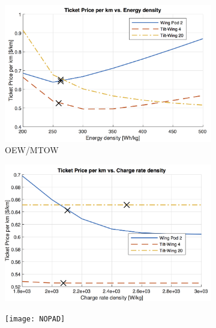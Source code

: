 \begin{figure}[H]
\begin{subfigure}[t]{0.33\textwidth}
    \centering
    \includegraphics[width=\textwidth]{Figures/Edens_TPrice_perkmNOPAD.png}
    \captionsetup{width=.8\linewidth}
    \caption{OEW/MTOW}
    \label{fig:sens1}
\end{subfigure}
\begin{subfigure}[t]{0.33\textwidth}
    \centering
    \includegraphics[width=\textwidth]{Figures/CRate_TPrice_perkmNOPAD.png}
    \captionsetup{width=.8\linewidth}
    \caption{}
    \label{fig:sens2}
\end{subfigure}
\begin{subfigure}[t]{0.33\textwidth}
    \centering
    \texttt{[image: NOPAD]}
    \captionsetup{width=.8\linewidth}
    \caption{}
    \label{fig:sens3}
\end{subfigure}
\label{fig:sens123}
\end{figure}

